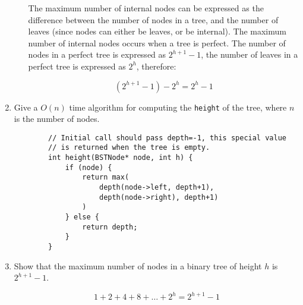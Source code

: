 \documentclass[11pt]{article}
\begin{document}
\begin{enumerate}
\begin{enumerate}
        The maximum number of internal nodes can be expressed as the difference between the number of nodes in a tree, and the number of leaves (since nodes can either be leaves, or be internal). The maximum number of internal nodes occurs when a tree is perfect. The number of nodes in a perfect tree is expressed as $2^{h+1}-1$, the number of leaves in a perfect tree is expressed as $2^h$, therefore:

        $$ (2^{h+1}-1)-2^h = 2^h - 1 $$
    \end{enumerate}

    \item Give a $O(n)$ time algorithm for computing the \verb|height| of the tree, where $n$ is the number of nodes.

    \begin{verbatim}
        // Initial call should pass depth=-1, this special value
        // is returned when the tree is empty.
        int height(BSTNode* node, int h) {
            if (node) {
                return max(
                    depth(node->left, depth+1), 
                    depth(node->right), depth+1)
                )
            } else {
                return depth;
            }
        }
    \end{verbatim}

    \item Show that the maximum number of nodes in a binary tree of height $h$ is $2^{h+1}-1$.

    $$ 1 + 2 + 4 + 8 + \ldots + 2^h = 2^{h+1} - 1 $$

\end{enumerate}

\label{r:lastpage}
\end{document}

